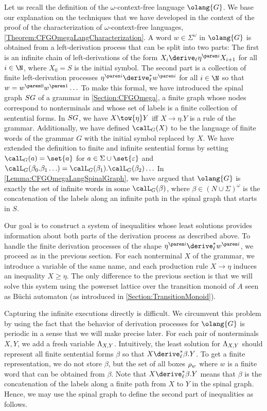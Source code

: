 \documentclass[../../diss.tex]{subfiles}
\begin{document}
Let us recall the definition of the $\omega$-context-free language $\olang{G}$.
We base our explanation on the techniques that we have developed in the context of the proof of the characterization of $\omega$-context-free languages, \cref{Theorem:CFGOmegaLangCharacterization}.
A word $w \in \Sigma^\omega$ in $\olang{G}$ is obtained from a left-derivation process that can be split into two parts:
The first is an infinite chain of left-derivations of the form $X_i \leftderive \itr{\eta}{i} X_{i+1}$ for all $i \in \N$, where $X_0 = S$ is the initial symbol.
The second part is a collection of finite left-derivation processes $\itr{\eta}{i} \leftderive^* \itr{w}{i}$ for all $i \in \N$ so that $w = \itr{w}{0} \itr{w}{1} \ldots$
To make this formal, we have introduced the spinal graph $SG$ of a grammar in \cref{Section:CFGOmega}, a finite graph whose nodes correspond to nonterminals and whose set of labels is a finite collection of sentential forms.
In $SG$, we have $X \tow{\eta} Y$ iff $X \to \eta.Y$ is a rule of the grammar.
Additionally, we have defined $\calL_G (X)$ to be the language of finite words of the grammar $G$ with the initial symbol replaced by $X$.
We have extended the definition to finite and infinite sentential forms by setting $\calL_G(a) = \set{a}$ for $a \in \Sigma \cup \set{\eps}$ and $\calL_G(\beta_0.\beta_1\ldots) = \calL_G(\beta_1).\calL_G(\beta_2)\ldots$
In \cref{Lemma:CFGOmegaLangSpinalGraph}, we have argued that $\olang{G}$ is exactly the set of infinite words in some $\calL_G(\beta)$, where $\beta \in {(N \cup \Sigma)}^\omega$ is the concatenation of the labels along an infinite path in the spinal graph that starts in $S$.

Our goal is to construct a system of inequalities whose least solutions provides information about both parts of the derivation process as described above.
To handle the finite derivation processes of the shape $\itr{\eta}{i} \leftderive^* \itr{w}{i}$, we proceed as in the previous section.
For each nonterminal $X$ of the grammar, we introduce a variable of the same name, and each production rule $X \to \eta$ induces an inequality
\(
    X \geq \eta
\).
The only difference to the previous section is that we will solve this system using the powerset lattice over the transition monoid of $A$ seen as Büchi automaton (as introduced in \cref{Section:TransitionMonoid}).

Capturing the infinite executions directly is difficult.
We circumvent this problem by using the fact that the behavior of derivation processes for $\olang{G}$ is periodic in a sense that we will make precise later.
For each pair of nonterminals $X,Y$, we add a fresh variable $\Lambda_{X,Y}$.
Intuitively, the least solution for $\Lambda_{X,Y}$ should represent all finite sentential forms $\beta$ so that $X \leftderive^* \beta.Y$.
To get a finite representation, we do not store $\beta$, but the set of all boxes $\tbox{w}$ where $w$ is a finite word that can be obtained from $\beta$.
Note that $X \leftderive^* \beta.Y$ means that $\beta$ is the concatenation of the labels along a finite path from $X$ to $Y$ in the spinal graph.
Hence, we may use the spinal graph to define the second part of inequalities as follows.
\end{document}
